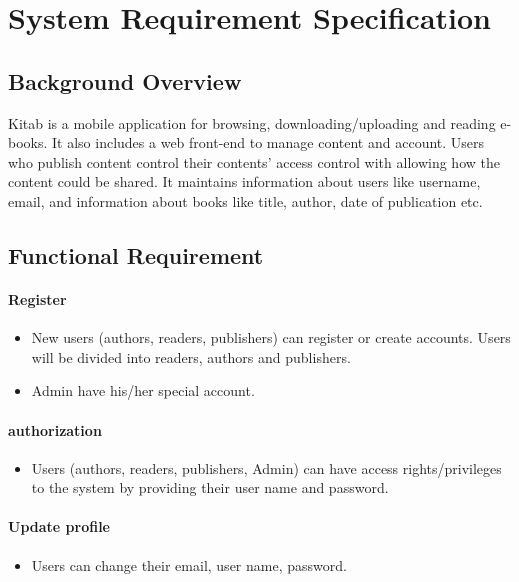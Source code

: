 \chapter{System Requirement Specification}
\section{Background Overview}

Kitab is a mobile application for browsing, downloading/uploading and reading e-books. It also includes a web front-end to manage content and account. Users who publish content control their contents’ access control with allowing how the content could be shared. It maintains information about users like username, email, and information about books like title, author, date of publication etc.

\section{Functional Requirement}
	\subsubsection{Register}

	\begin{itemize}
		\item New users (authors, readers, publishers) can register or create accounts. Users will be divided into readers, authors and publishers.
		\item Admin have his/her special account.
	\end{itemize}

	\subsubsection{authorization}
	\begin{itemize}
		\item Users (authors, readers, publishers, Admin) can have access rights/privileges to the system by providing their user name and password.
	\end{itemize}

	\subsubsection{Update profile}	
	\begin{itemize}
		\item Users can change their email, user name, password.
	\end{itemize}

